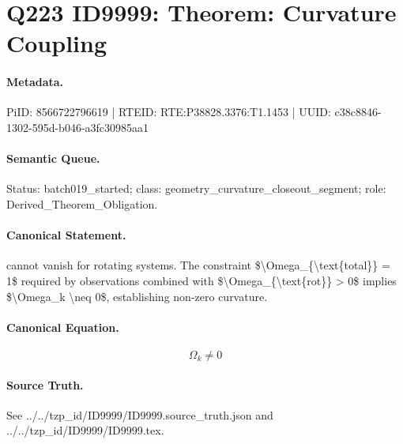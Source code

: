 \section*{Q223 ID9999: Theorem: Curvature Coupling}
\paragraph{Metadata.}
PiID: 8566722796619 | RTEID: RTE:P38828.3376:T1.1453 | UUID: c38c8846-1302-595d-b046-a3fc30985aa1

\paragraph{Semantic Queue.}
Status: batch019\_started; class: geometry\_curvature\_closeout\_segment; role: Derived\_Theorem\_Obligation.

\paragraph{Canonical Statement.}
cannot vanish for rotating systems. The constraint \$\textbackslash{}Omega\_\{\textbackslash{}text\{total\}\} = 1\$ required by observations combined with \$\textbackslash{}Omega\_\{\textbackslash{}text\{rot\}\} > 0\$ implies \$\textbackslash{}Omega\_k \textbackslash{}neq 0\$, establishing non-zero curvature.

\paragraph{Canonical Equation.}
\[
\Omega_k \neq 0
\]

\paragraph{Source Truth.}
See ../../tzp\_id/ID9999/ID9999.source\_truth.json and ../../tzp\_id/ID9999/ID9999.tex.
